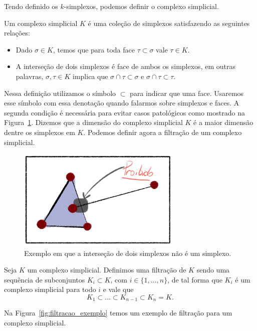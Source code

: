 Tendo definido os $k$-simplexos, podemos definir o complexo simplicial.
\begin{defi}
    Um complexo simplicial $K$ é uma coleção de simplexos satisfazendo as seguintes
    relações:
    \begin{itemize}
      \item Dado $\sigma \in K$, temos que para toda face $\tau \subset \sigma$
            vale $\tau \in K$.
      \item A interseção de dois simplexos é face de ambos os simplexos, em outras palavras,
      $\sigma, \tau \in K$ implica que $\sigma \cap \tau \subset \sigma$ e
      $\sigma \cap \tau \subset \tau$.
    \end{itemize}
\end{defi}
Nessa definição utilizamos o símbolo $\subset$ para indicar que uma face.
Usaremos esse símbolo com essa denotação quando falarmos sobre simplexos e
faces. A segunda condição é necessária para evitar casos patológicos como
mostrado na Figura~\ref{fig:simp_path}. Dizemos que a dimensão do complexo
simplicial $K$ é a maior dimensão dentre os simplexos em $K$. Podemos definir
agora a filtração de um complexo simplicial.
\begin{figure}[!htpb]
  \centering
  \includegraphics[width=0.7\textwidth]{images/simp_path.png}
  \caption{Exemplo em que a interseção de dois simplexos não é um simplexo.}
  \label{fig:simp_path}
  \fautor
\end{figure}
\begin{defi}
  Seja $K$ um complexo simplicial. Definimos uma filtração de $K$ sendo uma
  sequência de subconjuntos $K_i \subset K$, com $i \in \{ 1, \dots, n \}$,
  de tal forma que $K_i$ é um complexo simplicial para todo $i$ e vale que
  \begin{equation*}
    K_1 \subset \dots \subset K_{n-1} \subset K_n = K.
  \end{equation*}
\end{defi}
Na Figura~\ref{fig:filtracao_exemplo} temos um exemplo de filtração para um complexo
simplicial.

